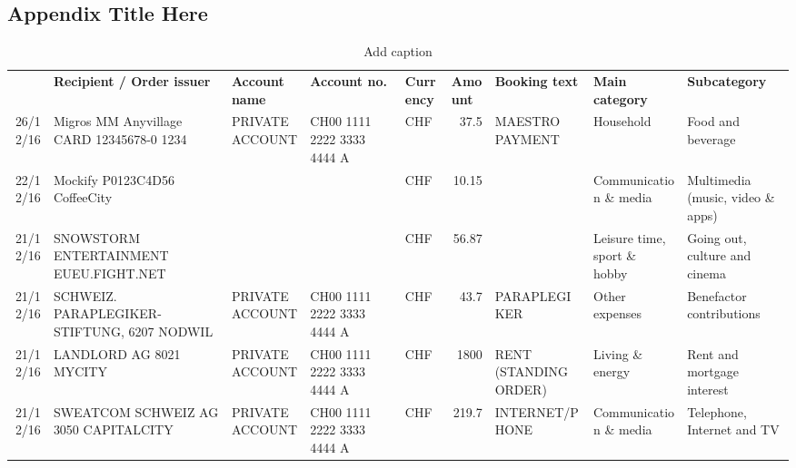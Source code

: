 
\begin{landscape}
	\begin{sidewaysfigure}

\chapter{Appendix Title Here} %

\label{AppendixA} %


\begin{table}[h]
	\begin{center}
	\caption{Add caption}
	\begin{tabular}{rllllrlll}
		\rowcolor[rgb]{ .859,  .859,  .859} \multicolumn{1}{l}{\textbf{Date}} & \textbf{Recipient / Order issuer} & \textbf{Account name} & \textbf{Account no.} & \textbf{Currency} & \multicolumn{1}{l}{\textbf{Amount}} & \textbf{Booking text} & \textbf{Main category} & \textbf{Subcategory} \\
		26/12/16 & Migros MM Anyvillage CARD 12345678-0 1234 & PRIVATE ACCOUNT & CH00 1111 2222 3333 4444 A & CHF   & 37.5  & MAESTRO PAYMENT & Household & Food and beverage \\
		22/12/16 & Mockify P0123C4D56       CoffeeCity &       &       & CHF   & 10.15 &       & Communication \& media & Multimedia (music, video \& apps) \\
		21/12/16 & SNOWSTORM ENTERTAINMENT EUEU.FIGHT.NET &       &       & CHF   & 56.87 &       & Leisure time, sport \& hobby & Going out, culture and cinema \\
		21/12/16 & SCHWEIZ. PARAPLEGIKER- STIFTUNG, 6207 NODWIL & PRIVATE ACCOUNT & CH00 1111 2222 3333 4444 A & CHF   & 43.7  & PARAPLEGIKER & Other expenses & Benefactor contributions \\
		21/12/16 & LANDLORD AG 8021 MYCITY & PRIVATE ACCOUNT & CH00 1111 2222 3333 4444 A & CHF   & 1800  & RENT (STANDING ORDER) & Living \& energy & Rent and mortgage interest \\
		21/12/16 & SWEATCOM SCHWEIZ AG 3050 CAPITALCITY & PRIVATE ACCOUNT & CH00 1111 2222 3333 4444 A & CHF   & 219.7 & INTERNET/PHONE & Communication \& media & Telephone,  Internet and TV \\

\end{tabular}
\end{center}
\end{table}
\end{sidewaysfigure}
\end{landscape}
